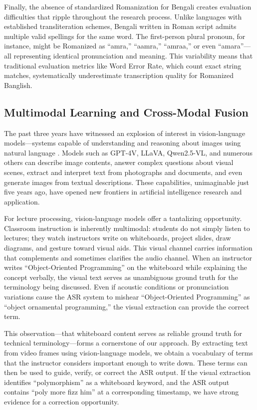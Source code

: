 Finally, the absence of standardized Romanization for Bengali creates evaluation difficulties that ripple throughout the research process. Unlike languages with established transliteration schemes, Bengali written in Roman script admits multiple valid spellings for the same word. The first-person plural pronoun, for instance, might be Romanized as ``amra,'' ``aamra,'' ``amraa,'' or even ``amara''---all representing identical pronunciation and meaning. This variability means that traditional evaluation metrics like Word Error Rate, which count exact string matches, systematically underestimate transcription quality for Romanized Banglish.

\subsection{Multimodal Learning and Cross-Modal Fusion}

The past three years have witnessed an explosion of interest in vision-language models---systems capable of understanding and reasoning about images using natural language \cite{Radford2021, Liu2023LLaVA, Wang2024Qwen2VL}. Models such as GPT-4V, LLaVA, Qwen2.5-VL, and numerous others can describe image contents, answer complex questions about visual scenes, extract and interpret text from photographs and documents, and even generate images from textual descriptions. These capabilities, unimaginable just five years ago, have opened new frontiers in artificial intelligence research and application.

For lecture processing, vision-language models offer a tantalizing opportunity. Classroom instruction is inherently multimodal: students do not simply listen to lectures; they watch instructors write on whiteboards, project slides, draw diagrams, and gesture toward visual aids. This visual channel carries information that complements and sometimes clarifies the audio channel. When an instructor writes ``Object-Oriented Programming'' on the whiteboard while explaining the concept verbally, the visual text serves as unambiguous ground truth for the terminology being discussed. Even if acoustic conditions or pronunciation variations cause the ASR system to mishear ``Object-Oriented Programming'' as ``object ornamental programming,'' the visual extraction can provide the correct term.

This observation---that whiteboard content serves as reliable ground truth for technical terminology---forms a cornerstone of our approach. By extracting text from video frames using vision-language models, we obtain a vocabulary of terms that the instructor considers important enough to write down. These terms can then be used to guide, verify, or correct the ASR output. If the visual extraction identifies ``polymorphism'' as a whiteboard keyword, and the ASR output contains ``poly more fizz him'' at a corresponding timestamp, we have strong evidence for a correction opportunity.

